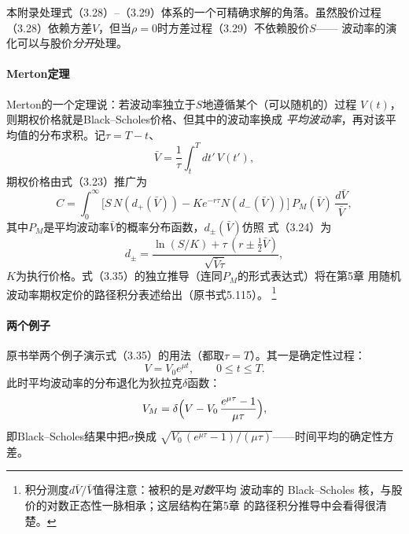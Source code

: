 本附录处理式（3.28）--（3.29）体系的一个可精确求解的角落。虽然股价过程
（3.28）依赖方差$V$，但当$\rho=0$时方差过程（3.29）不依赖股价$S$——
波动率的演化可以与股价\emph{分开}处理。

\paragraph{Merton定理}
Merton的一个定理说：若波动率独立于$S$地遵循某个（可以随机的）过程
$V(t)$，则期权价格就是Black--Scholes价格、但其中的波动率换成
\emph{平均波动率}，再对该平均值的分布求积。记$\tau=T-t$、
\begin{equation*}
\bar{V}=\frac{1}{\tau}\int_{t}^{T}dt'\,V(t'),
\end{equation*}
期权价格由式（3.23）推广为
\begin{equation*}
C=\int_{0}^{\infty}\bigl[S\,N(d_{+}(\bar{V}))
-Ke^{-r\tau}N(d_{-}(\bar{V}))\bigr]\,
P_{M}(\bar{V})\,\frac{d\bar{V}}{\bar{V}},
\tag{3.35}
\end{equation*}
其中$P_M$是平均波动率$\bar{V}$的概率分布函数，$d_{\pm}(\bar{V})$仿照
式（3.24）为
\begin{equation*}
d_{\pm}=\frac{\ln(S/K)+\tau\,(r\pm\frac{1}{2}\bar{V})}{\sqrt{\bar{V}\tau}},
\end{equation*}
$K$为执行价格。式（3.35）的独立推导（连同$P_M$的形式表达式）将在第5章
用随机波动率期权定价的路径积分表述给出（原书式5.115）。
\footnote{积分测度$d\bar{V}/\bar{V}$值得注意：被积的是\emph{对数}平均
波动率的 Black--Scholes 核，与股价的对数正态性一脉相承；这层结构在第5章
的路径积分推导中会看得很清楚。}

\paragraph{两个例子}
原书举两个例子演示式（3.35）的用法（都取$\tau=T$）。其一是确定性过程：
\begin{equation*}
V=V_{0}e^{\mu t},\qquad 0\leq t\leq T.
\end{equation*}
此时平均波动率的分布退化为狄拉克$\delta$函数：
\begin{equation*}
V_{M}=\delta\Bigl(V-V_{0}\,\frac{e^{\mu\tau}-1}{\mu\tau}\Bigr),
\end{equation*}
即Black--Scholes结果中把$\sigma$换成
$\sqrt{V_0\,(e^{\mu\tau}-1)/(\mu\tau)}$——时间平均的确定性方差。

